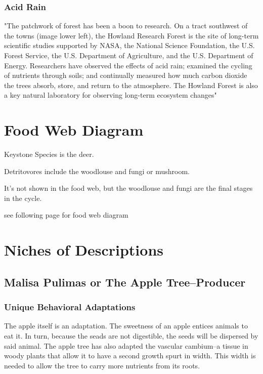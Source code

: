 \documentclass[paper=a4, fontsize=11pt]{article}
\begin{document}
\subsubsection{Acid Rain}
"The patchwork of forest has been a boon to research. 
On a tract southwest of the towns (image lower left), the Howland Research Forest is the site of long-term scientific studies supported by NASA, 
the National Science Foundation, the U.S. Forest Service, the U.S. 
Department of Agriculture, and the U.S. Department of Energy. Researchers have observed the effects of acid rain; 
examined the cycling of nutrients through soils; and continually measured how much carbon dioxide the trees absorb, store, and return to the atmosphere. 
The Howland Forest is also a key natural laboratory for observing long-term ecosystem changes" \cite{green_central}

\newpage
\section{Food Web Diagram}

Keystone Species is the deer. 

Detritovores include the woodlouse and fungi or mushroom.

It's not shown in the food web, but the woodlouse and fungi are the final stages in the cycle.

see following page for food web diagram





\section{Niches of Descriptions}


\subsection{Malisa Pulimas or The Apple Tree--Producer}
\subsubsection{Unique Behavioral Adaptations}
The apple itself is an adaptation. The sweetness of an apple entices animals to eat it. In turn, because the seads are not digestible, the seeds will be dispersed by said animal.
The apple tree has also adapted the vascular cambium--a tissue in woody plants that allow it to have a second growth spurt in width. This width is needed to allow the tree to 
carry more nutrients from its roots. \cite{malus}
\end{document}
